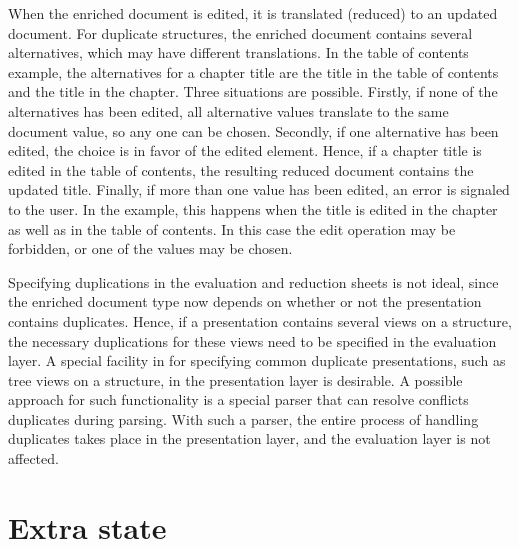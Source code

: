 When the enriched document is edited, it is translated (reduced) to an updated document. For duplicate structures, the enriched document contains several alternatives, which may have different translations. In the table of contents example, the alternatives for a chapter title are the title in the table of contents and the title in the chapter. Three situations are possible. Firstly, if none of the alternatives has been edited, all alternative values translate to the same document value, so any one can be chosen. Secondly, if one alternative has been edited, the choice is in favor of the edited element. Hence, if a chapter title is edited in the table of contents, the resulting reduced document contains the updated title. Finally, if more than one value has been edited, an error is signaled to the user. In the example, this happens when the title is edited in the chapter as well as in the table of contents. In this case the edit operation may be forbidden, or one of the values may be chosen.  

Specifying duplications in the evaluation and reduction sheets is not ideal, since the enriched document type now depends on whether or not the presentation contains duplicates. Hence, if a presentation contains several views on a structure, the necessary duplications for these views need to be specified in the evaluation layer. A special facility in for specifying common duplicate presentations, such as tree views on a structure, in the presentation layer is desirable. A possible approach for such functionality is a special parser that can resolve conflicts duplicates during parsing. With such a parser, the entire process of handling duplicates takes place in the presentation layer, and the evaluation layer is not affected. 

%																
%																
%																
\section{Extra state} \label{sect:extraState}



